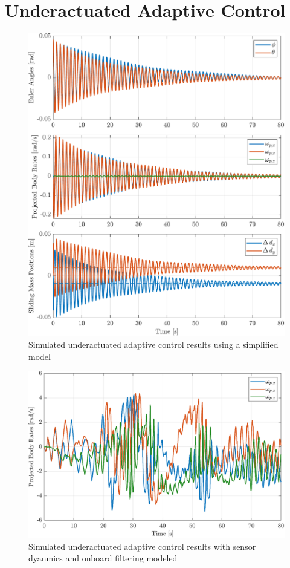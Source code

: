 \section{Underactuated Adaptive Control}

\begin{figure}[!ht]
    \centering
    \includegraphics[width=\linewidth]{plots/adaptive_sim_success.pdf}
    \caption{Simulated underactuated adaptive control results using a simplified model}
\end{figure}

\begin{figure}[!ht]
    \centering
    \includegraphics[width=\linewidth]{plots/adaptive_sim_failure.pdf}
    \caption{Simulated underactuated adaptive control results with sensor dyanmics and onboard filtering modeled}
\end{figure}

